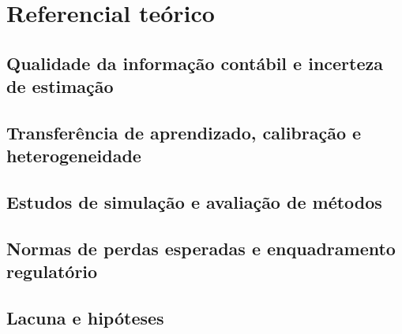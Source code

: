 \section{Referencial teórico}
\label{cap:referencial}
\aescrever

\subsection{Qualidade da informação contábil e incerteza de estimação}
\aescrever
\subsection{Transferência de aprendizado, calibração e heterogeneidade}
\aescrever
\subsection{Estudos de simulação e avaliação de métodos}
\aescrever
\subsection{Normas de perdas esperadas e enquadramento regulatório}
\aescrever
\subsection{Lacuna e hipóteses}
\aescrever
